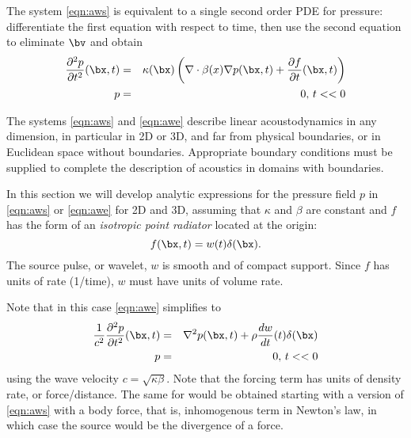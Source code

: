 The system \ref{eqn:aws} is equivalent to a single second order PDE for pressure: differentiate the first equation with respect to time, then use the second equation to eliminate $\bv$ and obtain
\begin{eqnarray}
\label{eqn:awe}
\frac{\partial^2 p}{\partial t^2}(\bx,t) & = &\kappa(\bx)\left(\nabla \cdot \beta(x) \nabla p(\bx,t) + \frac{\partial f}{\partial t}(\bx,t)\right) \nonumber\\
p & = & 0, \,t<<0
\end{eqnarray}

The systems \ref{eqn:aws} and \ref{eqn:awe} describe linear acoustodynamics in any dimension, in particular in 2D or 3D, and far from physical boundaries, or in Euclidean space without boundaries. Appropriate boundary conditions must be supplied to complete the description of acoustics in  domains with boundaries. 

In this section we will develop analytic expressions for the pressure field $p$ in \ref{eqn:aws} or \ref{eqn:awe} for 2D and 3D, assuming that $\kappa$ and $\beta$ are constant and $f$ has the form of an {\em isotropic point radiator} located at the origin:
\begin{equation}
\label{eqn:ipr}
f(\bx,t) = w(t) \delta(\bx).
\end{equation}
The source pulse, or wavelet, $w$ is smooth and of compact support.
Since $f$ has units of rate (1/time), $w$ must have units of volume rate.

Note that in this case \ref{eqn:awe} simplifies to 
\begin{eqnarray}
\label{eqn:aweccipr}
\frac{1}{c^2}\frac{\partial^2 p}{\partial t^2}(\bx,t) & = &\nabla^2 p(\bx,t) + \rho\frac{dw}{dt}(t)\delta(\bx) \nonumber\\
p & = & 0, \,t<<0 
\end{eqnarray}
using the wave velocity $c=\sqrt{\kappa\beta}$. Note that the forcing term has units of density rate, or force/distance. The same for would be obtained starting with a version of \ref{eqn:aws} with a body force, that is, inhomogenous term in Newton's law, in which case the source would be the divergence of a force.

